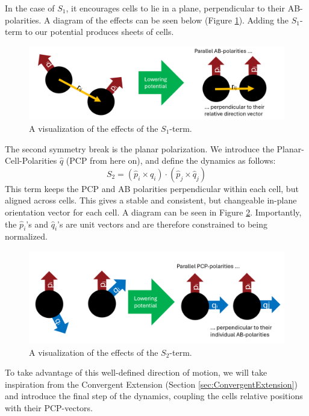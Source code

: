 In the case of $S_1$, it encourages cells to lie in a plane, perpendicular to their AB-polarities. A diagram of the effects can be seen below (Figure \ref{fig:explain-S1}). Adding the $S_1$-term to our potential produces sheets of cells. 


\begin{figure}[H]
    \centering
    \includegraphics[width=1\linewidth]{chapters//Theory//figures/explainS1.png}
    \caption{A visualization of the effects of the $S_1$-term.}
    \label{fig:explain-S1}
\end{figure}

The second symmetry break is the planar polarization. We introduce the Planar-Cell-Polarities $\hat{q}$ (PCP from here on), and define the dynamics as follows:
\begin{equation*}
    S_2=\left(\hat{p}_i \times \hat{q}_{i}\right) \cdot\left(\hat{p}_j \times \hat{q}_{j}\right)
\end{equation*}
This term keeps the PCP and AB polarities perpendicular within each cell, but aligned across cells. This gives a stable and consistent, but changeable in-plane orientation vector for each cell. A diagram can be seen in Figure \ref{fig:explain-S2}. Importantly, the $\hat{p}_i$'s and $\hat{q}_i$'s are unit vectors and are therefore constrained to being normalized.\\
\begin{figure}[H]
    \centering
    \includegraphics[width=1\linewidth]{chapters//Theory//figures/explainS2.png}
    \caption{A visualization of the effects of the $S_2$-term.}
    \label{fig:explain-S2}
\end{figure}
To take advantage of this well-defined direction of motion, we will take inspiration from the Convergent Extension (Section \ref{sec:ConvergentExtension}) and introduce the final step of the dynamics, coupling the cells relative positions with their PCP-vectors.

